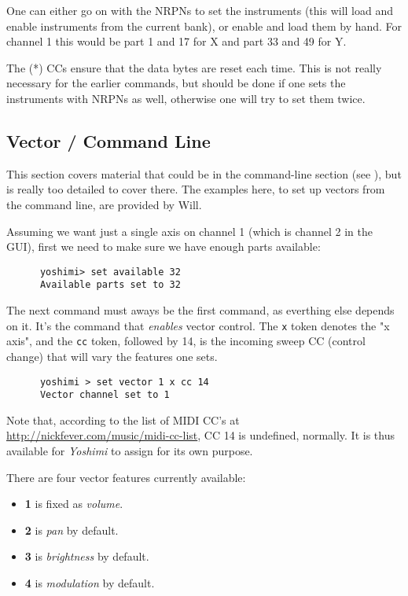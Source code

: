    One can either go on with the NRPNs to set the instruments (this will load
   and enable instruments from the current bank), or enable and load
   them by hand.  For channel 1 this would be part 1 and 17 for X and part 33
   and 49 for Y.

   The (*) CCs ensure that the data bytes are reset each time. This is not
   really necessary for the earlier commands, but should be done if one sets
   the instruments with NRPNs as well, otherwise one will try to set them
   twice.

\subsection{Vector / Command Line}
\label{subsection:vector_command_line}

   This section covers material that could be in the command-line section
   (see ), but is really too detailed to cover
   there.  The examples here, to set up vectors from the command line,
   are provided by Will.

   Assuming we want just a single axis on channel 1 (which is channel
   2 in the GUI), first we need to make sure we have enough parts available:

   \begin{verbatim}
      yoshimi> set available 32
      Available parts set to 32
   \end{verbatim}

   The next command must aways be the first command, as everthing else depends
   on it. It's the command that \textsl{enables} vector control.  The
   \texttt{x} token denotes the "x axis", and the \texttt{cc} token, followed
   by 14, is the incoming sweep CC (control change) that will vary the
   features one sets.

   \begin{verbatim}
      yoshimi > set vector 1 x cc 14
      Vector channel set to 1
   \end{verbatim}

   Note that, according to the list of MIDI CC's at
   \url{http://nickfever.com/music/midi-cc-list}, CC 14 is undefined,
   normally.  It is thus available for \textsl{Yoshimi} to assign
   for its own purpose.

   There are four vector features currently available:

   \begin{itemize}
      \item \textbf{1} is fixed as \textsl{volume}.
      \item \textbf{2} is \textsl{pan} by default.
      \item \textbf{3} is \textsl{brightness} by default.
      \item \textbf{4} is \textsl{modulation} by default.
   \end{itemize}

